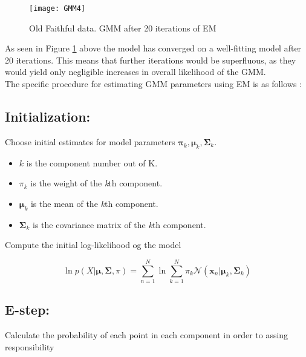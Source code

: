 \begin{figure}[H]
\centering
\texttt{[image: GMM4]}
\caption{Old Faithful data. GMM after 20 iterations of EM}
\label{fig:GMM4}
\end{figure}

As seen in Figure \ref{fig:GMM4} above the model has converged on a well-fitting model after 20 iterations.
This means that further iterations would be superfluous, as they would yield only negligible increases in overall likelihood of the GMM. \\

The specific procedure for estimating GMM parameters using EM is as follows \cite{bishop2007}: 

\subsection*{Initialization:}

Choose initial estimates for model parameters $ \mathbf{\pi}_{k}, \mathbf{\mu}_{k}, \mathbf{\Sigma}_{k} $.

\begin{itemize}

\item
$ k $ is the component number out of K.

\item
$ \pi_{k} $  is the weight of the \textit{k}th component.

\item
$ \mathbf{\mu}_{k}$ is the mean of the \textit{k}th component.

\item
$ \mathbf{\Sigma}_{k} $ is the covariance matrix of the \textit{k}th component.

\end{itemize}


Compute the initial log-likelihood og the model

\begin{equation} \label{eq:loglikeGMM}
\ln p\left(X | \mathbf{\mu}, \mathbf{\Sigma}, \pi\right) = 
\sum_{n=1}^{N} \ln \sum_{k=1}^{N} \pi_{k}\mathcal{N}(\mathbf{x}_{n}|\mathbf{\mu}_{k},\mathbf{\Sigma}_{k})
\end{equation}

\subsection*{E-step:}
Calculate the probability of each point in each component in order to assing responsibility

